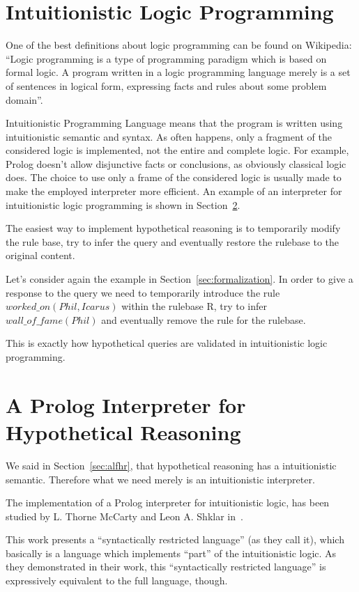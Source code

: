 \section{Intuitionistic Logic Programming}
\label{sec:ilp}
One of the best definitions about logic programming can be found on Wikipedia:
``Logic programming is a type of programming paradigm which is based on formal logic.
A program written in a logic programming language merely is a set of sentences in
logical form, expressing facts and rules about some problem domain''.

Intuitionistic Programming Language means that the program is written using
intuitionistic semantic and syntax. As often happens, only a fragment of
the considered logic is implemented, not the entire and complete logic.
For example, Prolog doesn't allow disjunctive facts or conclusions, as obviously
classical logic does. The choice to use only a frame of the considered logic is usually made
to make the employed interpreter more efficient. An example of an interpreter for
intuitionistic logic programming is shown in Section~\ref{sec:apifhr}.

The easiest way to implement hypothetical reasoning is to temporarily modify the rule
base, try to infer the query and eventually restore the rulebase to the original content.

Let's consider again the example in Section~\ref{sec:formalization}. In order
to give a response to the query we need to temporarily introduce the rule
$worked\_on(Phil, Icarus)$ within the rulebase R, try to infer $wall\_of\_fame(Phil)$
and eventually remove the rule for the rulebase.

This is exactly how hypothetical queries are validated in intuitionistic logic
programming.

\section{A Prolog Interpreter for Hypothetical Reasoning}
\label{sec:apifhr}
We said in Section~\ref{sec:alfhr}, that hypothetical reasoning has a intuitionistic semantic.
Therefore what we need merely is an intuitionistic interpreter.

The implementation of a Prolog interpreter for intuitionistic logic,
has been studied by L. Thorne McCarty and Leon A. Shklar in~\cite{McCartyS94}.

This work presents a ``syntactically restricted language'' (as they call it), which basically
is a language which implements ``part'' of the intuitionistic logic.
As they demonstrated in their work, this ``syntactically restricted language'' is
expressively equivalent to the full language, though.

